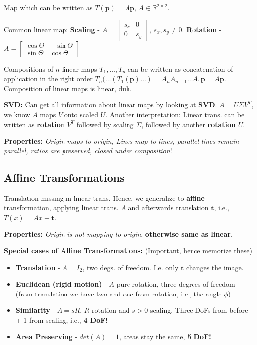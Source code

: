 Map which can be written as $T(\mathbf{p}) = A\mathbf{p}$, $A \in \mathbb{R}^{2\times 2}$.

Common linear map: \textbf{Scaling} - $A = \left[\begin{matrix}s_x & 0 \\ 0  & s_y \end{matrix}\right]$, $s_x , s_y \neq 0$. \textbf{Rotation} - $A = \left[\begin{matrix}\cos \Theta & -\sin \Theta \\ \sin \Theta  & \cos \Theta \end{matrix}\right]$

Compositions of $n$ linear maps $T_1, \dots, T_n$ can be written as concatenation of application in the right order $T_n(\dots(T_1(\mathbf{p})\dots ) = A_n A_{n-1} \dots A_1 \mathbf{p} = A \mathbf{p}$. Composition of linear maps is linear, duh.

\textbf{SVD:} Can get all information about linear maps by looking at \textbf{SVD}. $A = U \Sigma V^T$, we know $A$ maps $V$ onto scaled $U$. Another interpretation: Linear trans. can be written as \textbf{rotation} $V^T$ followed by scaling $\Sigma$, followed by another \textbf{rotation} $U$.

\textbf{Properties:} \textit{Origin maps to origin, Lines map to lines, parallel lines remain parallel, ratios are preserved, closed under composition}!

\subsection{Affine Transformations}
Translation missing in linear trans. Hence, we generalize to \textbf{affine} transformation, applying linear trans. $A$ and afterwards translation $\mathbf{t}$, i.e., $T(x) = Ax + \mathbf{t}$.

\textbf{Properties:} \textit{Origin is not mapping to origin}, \textbf{otherwise same as linear}.

\textbf{Special cases of  Affine Transformations:} (Important, hence memorize these)

\begin{itemize}
    \item \textbf{Translation} - $A = I_2$, two degs. of freedom. I.e. only $\mathbf{t}$ changes the image.
    \item \textbf{Euclidean (rigid motion)} - $A$ pure rotation, three degrees of freedom (from translation we have two and one from rotation, i.e., the angle $\phi$)
    \item \textbf{Similarity} - $A = sR$, $R$ rotation and $s > 0$ scaling. Three DoFs from before + 1 from scaling, i.e., \textbf{4 DoF!}
    \item \textbf{Area Preserving} - $det(A)  = 1$, areas stay the same, \textbf{5 DoF!}
\end{itemize}

